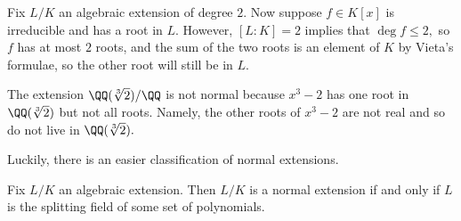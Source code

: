 \begin{example}
	Fix $L/K$ an algebraic extension of degree $2.$ Now suppose $f\in K[x]$ is irreducible and has a root in $L.$ However, $[L:K]=2$ implies that $\deg f\le2,$ so $f$ has at most $2$ roots, and the sum of the two roots is an element of $K$ by Vieta's formulae, so the other root will still be in $L.$
\end{example}
\begin{nex}
	The extension $\QQ(\sqrt[3]2)/\QQ$ is not normal because $x^3-2$ has one root in $\QQ(\sqrt[3]2)$ but not all roots. Namely, the other roots of $x^3-2$ are not real and so do not live in $\QQ(\sqrt[3]2).$
\end{nex}
Luckily, there is an easier classification of normal extensions.
\begin{proposition} \label{prop:normalissplitting}
	Fix $L/K$ an algebraic extension. Then $L/K$ is a normal extension if and only if $L$ is the splitting field of some set of polynomials.
\end{proposition}
